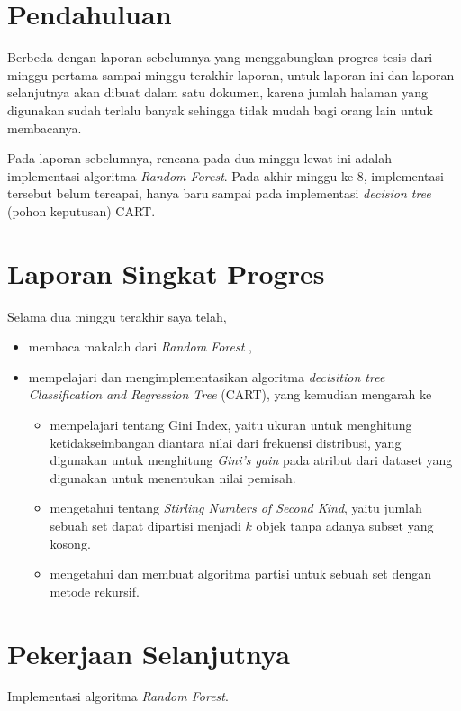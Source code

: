 






\section{Pendahuluan}

Berbeda dengan laporan sebelumnya yang menggabungkan progres tesis dari minggu pertama sampai minggu terakhir laporan, untuk laporan ini dan laporan selanjutnya akan dibuat dalam satu dokumen, karena jumlah halaman yang digunakan sudah terlalu banyak sehingga tidak mudah bagi orang lain untuk membacanya.

Pada laporan sebelumnya, rencana pada dua minggu lewat ini adalah implementasi algoritma \textit{Random Forest}. Pada akhir minggu ke-8, implementasi tersebut belum tercapai, hanya baru sampai pada implementasi \textit{decision tree} (pohon keputusan) CART.

\section{Laporan Singkat Progres}

Selama dua minggu terakhir saya telah,
\begin{itemize}
\item membaca makalah dari \textit{Random Forest} \cite{breiman2001random},
\item mempelajari dan mengimplementasikan algoritma \textit{decisition tree} \textit{Classification and Regression Tree} (CART), yang kemudian mengarah ke
	\begin{itemize}
	\item mempelajari tentang Gini Index, yaitu ukuran untuk menghitung ketidakseimbangan diantara nilai dari frekuensi distribusi, yang digunakan untuk menghitung \textit{Gini's gain} pada atribut dari dataset yang digunakan untuk menentukan nilai pemisah.
	\item mengetahui tentang \textit{Stirling Numbers of Second Kind}, yaitu jumlah sebuah set dapat dipartisi menjadi $ k $ objek tanpa adanya subset yang kosong.
	\item mengetahui dan membuat algoritma partisi untuk sebuah set dengan metode rekursif.
	\end{itemize}
\end{itemize}



\section{Pekerjaan Selanjutnya}

Implementasi algoritma \textit{Random Forest}.


\advisorsignature

\clearpage
{}
\printbibliography

\newpage
\appendix



